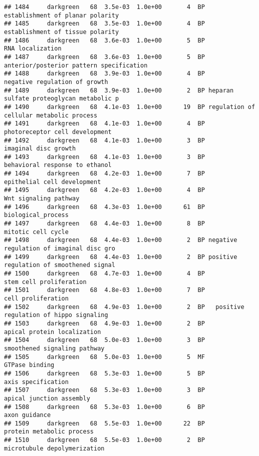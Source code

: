 \documentclass[]{article}
\begin{document}
\begin{verbatim}
## 1484     darkgreen   68  3.5e-03  1.0e+00       4  BP         establishment of planar polarity
## 1485     darkgreen   68  3.5e-03  1.0e+00       4  BP         establishment of tissue polarity
## 1486     darkgreen   68  3.6e-03  1.0e+00       5  BP                         RNA localization
## 1487     darkgreen   68  3.6e-03  1.0e+00       5  BP anterior/posterior pattern specification
## 1488     darkgreen   68  3.9e-03  1.0e+00       4  BP            negative regulation of growth
## 1489     darkgreen   68  3.9e-03  1.0e+00       2  BP heparan sulfate proteoglycan metabolic p
## 1490     darkgreen   68  4.1e-03  1.0e+00      19  BP regulation of cellular metabolic process
## 1491     darkgreen   68  4.1e-03  1.0e+00       4  BP           photoreceptor cell development
## 1492     darkgreen   68  4.1e-03  1.0e+00       3  BP                     imaginal disc growth
## 1493     darkgreen   68  4.1e-03  1.0e+00       3  BP           behavioral response to ethanol
## 1494     darkgreen   68  4.2e-03  1.0e+00       7  BP              epithelial cell development
## 1495     darkgreen   68  4.2e-03  1.0e+00       4  BP                    Wnt signaling pathway
## 1496     darkgreen   68  4.3e-03  1.0e+00      61  BP                       biological_process
## 1497     darkgreen   68  4.4e-03  1.0e+00       8  BP                       mitotic cell cycle
## 1498     darkgreen   68  4.4e-03  1.0e+00       2  BP negative regulation of imaginal disc gro
## 1499     darkgreen   68  4.4e-03  1.0e+00       2  BP positive regulation of smoothened signal
## 1500     darkgreen   68  4.7e-03  1.0e+00       4  BP                  stem cell proliferation
## 1501     darkgreen   68  4.8e-03  1.0e+00       7  BP                       cell proliferation
## 1502     darkgreen   68  4.9e-03  1.0e+00       2  BP   positive regulation of hippo signaling
## 1503     darkgreen   68  4.9e-03  1.0e+00       2  BP              apical protein localization
## 1504     darkgreen   68  5.0e-03  1.0e+00       3  BP             smoothened signaling pathway
## 1505     darkgreen   68  5.0e-03  1.0e+00       5  MF                           GTPase binding
## 1506     darkgreen   68  5.3e-03  1.0e+00       5  BP                       axis specification
## 1507     darkgreen   68  5.3e-03  1.0e+00       3  BP                 apical junction assembly
## 1508     darkgreen   68  5.3e-03  1.0e+00       6  BP                            axon guidance
## 1509     darkgreen   68  5.5e-03  1.0e+00      22  BP                protein metabolic process
## 1510     darkgreen   68  5.5e-03  1.0e+00       2  BP             microtubule depolymerization

\end{verbatim}
\end{document}
